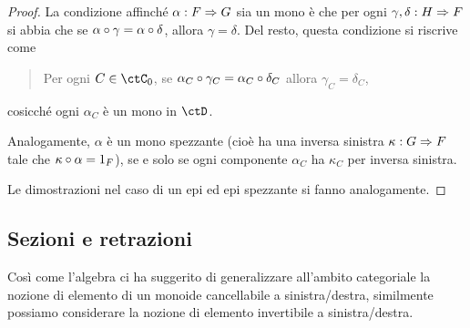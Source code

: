 \begin{proof}
	La condizione affinché \(\alpha : F\Rightarrow G\) sia un mono è che per ogni \(\gamma,\delta : H\Rightarrow F\) si abbia che se \(\alpha\circ \gamma = \alpha\circ \delta\), allora \(\gamma=\delta\). Del resto, questa condizione si riscrive come
	\begin{quote}
		Per ogni \(C\in\ctC_0\), se \(\alpha_C\circ \gamma_C = \alpha_C\circ \delta_C\) allora \(\gamma_C = \delta_C\),
	\end{quote}
	cosicché ogni \(\alpha_C\) è un mono in \(\ctD\).

	Analogamente, \(\alpha\) è un mono spezzante (cioè ha una inversa sinistra \(\kappa : G\Rightarrow F\) tale che \(\kappa\circ\alpha=1_F\)), se e solo se ogni componente \(\alpha_C\) ha \(\kappa_C\) per inversa sinistra.

	Le dimostrazioni nel caso di un epi ed epi spezzante si fanno analogamente.
\end{proof}
\subsection{Sezioni e retrazioni}\label{sec_sezretraz}
Così come l'algebra ci ha suggerito di generalizzare all'ambito categoriale la nozione di elemento di un monoide cancellabile a sinistra/destra,
similmente possiamo considerare la nozione di elemento invertibile a sinistra/destra.

